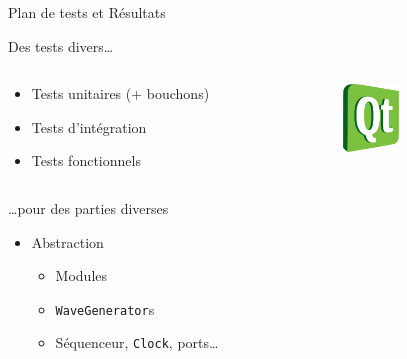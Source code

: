 \documentclass[frenchb]{beamer}
\begin{document}
\begin{frame}{Plan de tests et Résultats}
    \begin{block}{Des tests divers\ldots{}}
        \begin{columns}
            \begin{column}[l]{6cm}
                \begin{itemize}
                    \item Tests unitaires (+ bouchons)
                    \item Tests d'intégration
                    \item Tests fonctionnels
                \end{itemize}
            \end{column}
            \begin{column}[r]{5cm}
                \begin{center}
                    \includegraphics[width=1.5cm]{../img/ps/Qt.pdf}
                \end{center}
            \end{column}
        \end{columns}
    \end{block}

    \begin{block}{\centering \ldots{}pour des parties diverses}
        \begin{itemize}
            \item Abstraction
            \begin{itemize}
                \item Modules
                \item \texttt{WaveGenerator}s
                \item Séquenceur, \texttt{Clock}, ports\ldots{}
            \end{itemize}
        \end{itemize}
    \end{block}
\end{frame}
\end{document}
